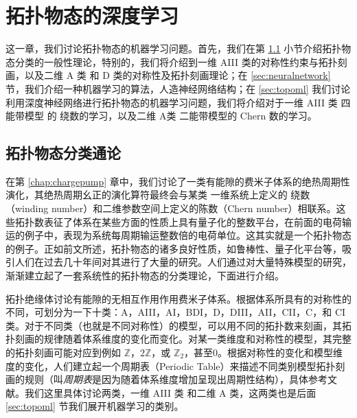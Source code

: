 \chapter{拓扑物态的深度学习} \label{chap:topoml}

这一章，我们讨论拓扑物态的机器学习问题。首先，我们在第 \ref{sec:classify} 小节介绍拓扑物态分类的一般性理论，特别的，我们将介绍到一维 AIII 类的对称性约束与拓扑刻画，以及二维 A 类 和 D 类的对称性及拓扑刻画理论；在 \ref{sec:neuralnetwork} 节，我们介绍一种机器学习的算法，人造神经网络结构；在 \ref{sec:topoml} 我们讨论利用深度神经网络进行拓扑物态的机器学习问题，我们将介绍对于一维 AIII 类 四能带模型 的 绕数的学习，以及二维 A类 二能带模型的 Chern 数的学习。



\section{拓扑物态分类通论} \label{sec:classify}
在第 \ref{chap:chargepump} 章中，我们讨论了一类有能隙的费米子体系的绝热周期性演化，其绝热周期幺正的演化算符最终会与某类 一维系统上定义的 绕数（winding number）和二维参数空间上定义的陈数（Chern number）相联系。这些拓扑数表征了体系在某些方面的性质上具有量子化的整数平台，在前面的电荷输运的例子中，表现为系统每周期输运整数倍的电荷单位。这其实就是一个拓扑物态的例子。正如前文所述，拓扑物态的诸多良好性质，如鲁棒性、量子化平台等，吸引人们在过去几十年间对其进行了大量的研究。人们通过对大量特殊模型的研究，渐渐建立起了一套系统性的拓扑物态的分类理论\cite{topoclassify2016}，下面进行介绍。

拓扑绝缘体讨论有能隙的无相互作用作用费米子体系。根据体系所具有的对称性的不同，可划分为一下十类：A，AIII，AI，BDI，D，DIII，AII，CII，C，和 CI 类。对于不同类（也就是不同对称性）的模型，可以用不同的拓扑数来刻画，其拓扑刻画的规律随着体系维度的变化而变化。对某一类维度和对称性的模型，其完整的拓扑刻画可能对应到例如 $\mathbb{Z}$，$2\mathbb{Z}$，或 $\mathbb{Z}_2$，甚至0。根据对称性的变化和模型维度的变化，人们建立起一个周期表（Periodic Table）来描述不同类别模型拓扑刻画的规则（叫\textit{周期表}是因为随着体系维度增加呈现出周期性结构），具体参考文献。我们这里具体讨论两类，一维 AIII 类 和二维 A 类，这两类也是后面 \ref{sec:topoml} 节我们展开机器学习的类别。

